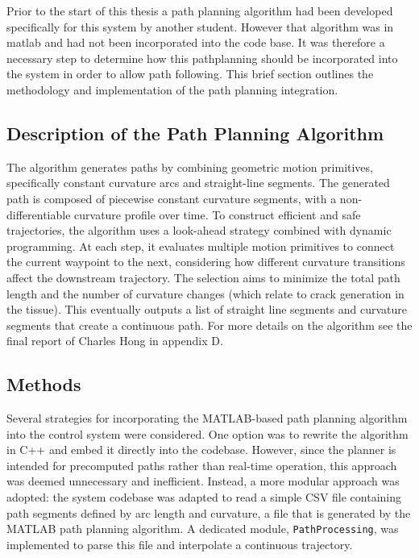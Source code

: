 Prior to the start of this thesis a path planning algorithm had been developed specifically for this system by another student. However that algorithm was in matlab and had not been incorporated into the code base. It was therefore a necessary step to determine how this pathplanning should be incorporated into the system in order to allow path following. This brief section outlines the methodology and implementation of the path planning integration.

\subsection{Description of the Path Planning Algorithm}
The algorithm generates paths by combining geometric motion primitives, specifically constant curvature arcs and straight-line segments. The generated path is composed of piecewise constant curvature segments, with a non-differentiable curvature profile over time. To construct efficient and safe trajectories, the algorithm uses a look-ahead strategy combined with dynamic programming. At each step, it evaluates multiple motion primitives to connect the current waypoint to the next, considering how different curvature transitions affect the downstream trajectory. The selection aims to minimize the total path length and the number of curvature changes (which relate to crack generation in the tissue). This eventually outputs a list of straight line segments and curvature segments that create a continuous path. For more details on the algorithm see the final report of Charles Hong in appendix D.

\subsection{Methods}
Several strategies for incorporating the MATLAB-based path planning algorithm into the control system were considered. One option was to rewrite the algorithm in C++ and embed it directly into the codebase. However, since the planner is intended for precomputed paths rather than real-time operation, this approach was deemed unnecessary and inefficient.
\newline \newline
Instead, a more modular approach was adopted: the system codebase was adapted to read a simple CSV file containing path segments defined by arc length and curvature, a file that is generated by the MATLAB path planning algorithm. A dedicated module, \texttt{PathProcessing}, was implemented to parse this file and interpolate a continuous trajectory. 

